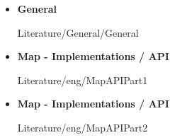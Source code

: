 \begin{itemize}
  \item
    \textbf{General}
    \begin{btSect}{Literature/General/General}
      \btPrintAll
    \end{btSect}
\end{itemize}
\newpage
\begin{itemize}
  \item
    \textbf{Map - Implementations / API}
    \begin{btSect}{Literature/eng/MapAPIPart1}
      \btPrintAll
    \end{btSect}
\end{itemize}
\newpage
\begin{itemize}
  \item
    \textbf{Map - Implementations / API}
    \begin{btSect}{Literature/eng/MapAPIPart2}
      \btPrintAll
    \end{btSect}
\end{itemize}